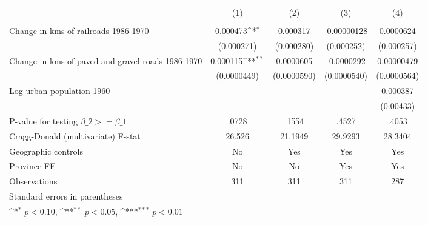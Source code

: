 {
\def\sym#1{\ifmmode^{#1}\else\(^{#1}\)\fi}
\begin{tabular}{l*{4}{c}}
\hline\hline
                &\multicolumn{1}{c}{(1)}&\multicolumn{1}{c}{(2)}&\multicolumn{1}{c}{(3)}&\multicolumn{1}{c}{(4)}\\
                &\multicolumn{1}{c}{}&\multicolumn{1}{c}{}&\multicolumn{1}{c}{}&\multicolumn{1}{c}{}\\
\hline
Change in kms of railroads 1986-1970& 0.000473\sym{*}  & 0.000317         &-0.00000128         &0.0000624         \\
                &(0.000271)         &(0.000280)         &(0.000252)         &(0.000257)         \\
[1em]
Change in kms of paved and gravel roads 1986-1970& 0.000115\sym{**} &0.0000605         &-0.0000292         &0.00000479         \\
                &(0.0000449)         &(0.0000590)         &(0.0000540)         &(0.0000564)         \\
[1em]
Log urban population 1960&                  &                  &                  & 0.000387         \\
                &                  &                  &                  &(0.00433)         \\
\hline
P-value for testing $\beta\_{2} >= \beta\_{1}$&    .0728         &    .1554         &    .4527         &    .4053         \\
Cragg-Donald (multivariate) F-stat&   26.526         &  21.1949         &  29.9293         &  28.3404         \\
Geographic controls&       No         &      Yes         &      Yes         &      Yes         \\
Province FE     &       No         &       No         &      Yes         &      Yes         \\
Observations    &      311         &      311         &      311         &      287         \\
\hline\hline
\multicolumn{5}{l}{\footnotesize Standard errors in parentheses}\\
\multicolumn{5}{l}{\footnotesize \sym{*} \(p<0.10\), \sym{**} \(p<0.05\), \sym{***} \(p<0.01\)}\\
\end{tabular}
}
